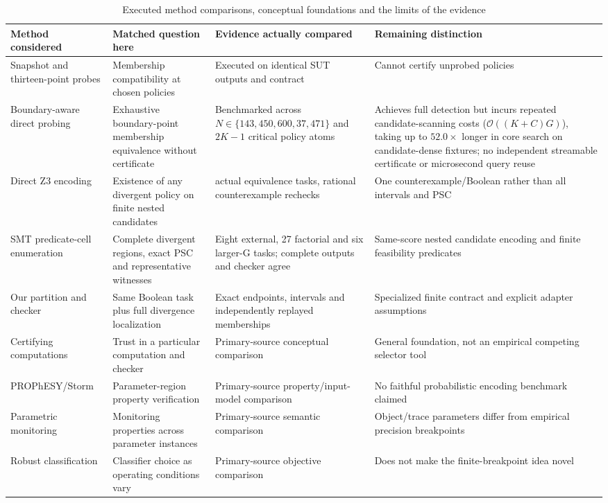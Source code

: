 \documentclass[11pt,a4paper]{article}
\theoremstyle{plain}
\theoremstyle{definition}
\theoremstyle{remark}
\begin{document}
\begin{table}[!htbp]
\caption{Executed method comparisons, conceptual foundations and the limits of the evidence}\label{tab:s16}
\centering
\footnotesize
\setlength{\tabcolsep}{3pt}
\renewcommand{\arraystretch}{1.15}
\begin{tabularx}{\textwidth}{@{} >{\raggedright\arraybackslash}p{2.8cm} >{\raggedright\arraybackslash}p{3.2cm} >{\raggedright\arraybackslash}X >{\raggedright\arraybackslash}X @{}}
\toprule
\textbf{Method considered} & \textbf{Matched question here} & \textbf{Evidence actually compared} & \textbf{Remaining distinction} \\
\midrule
Snapshot and thirteen-point probes & Membership compatibility at chosen policies & Executed on identical SUT outputs and contract & Cannot certify unprobed policies \\
Boundary-aware direct probing & Exhaustive boundary-point membership equivalence without certificate & Benchmarked across $N \in \{143, 450, 600, 37{,}471\}$ and $2K-1$ critical policy atoms & Achieves full detection but incurs repeated candidate-scanning costs ($\mathcal{O}((K+C)G)$), taking up to $52.0\times$ longer in core search on candidate-dense fixtures; no independent streamable certificate or microsecond query reuse \\
Direct Z3 encoding & Existence of any divergent policy on finite nested candidates & 93 actual equivalence tasks, rational counterexample rechecks & One counterexample/Boolean rather than all intervals and PSC \\
SMT predicate-cell enumeration \cite{demoura2008z3,mathsat_api} & Complete divergent regions, exact PSC and representative witnesses & Eight external, 27 factorial and six larger-G tasks; complete outputs and checker agree & Same-score nested candidate encoding and finite feasibility predicates \\
Our partition and checker & Same Boolean task plus full divergence localization & Exact endpoints, intervals and independently replayed memberships & Specialized finite contract and explicit adapter assumptions \\
Certifying computations \cite{alkassar2013framework,mcconnell2011certifying} & Trust in a particular computation and checker & Primary-source conceptual comparison & General foundation, not an empirical competing selector tool \\
PROPhESY/\allowbreak Storm \cite{storm2026parametric,junges2024parameter,dehnert2015prophesy} & Parameter-region property verification & Primary-source property/input-model comparison & No faithful probabilistic encoding benchmark claimed \\
Parametric monitoring \cite{chen2009parametric} & Monitoring properties across parameter instances & Primary-source semantic comparison & Object/trace parameters differ from empirical precision breakpoints \\
Robust classification \cite{provost2001robust} & Classifier choice as operating conditions vary & Primary-source objective comparison & Does not make the finite-breakpoint idea novel \\
\bottomrule
\end{tabularx}
\end{table}
\FloatBarrier
\end{document}
